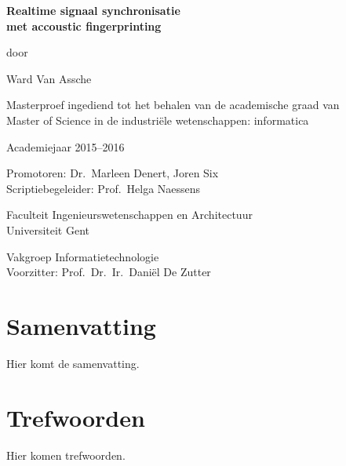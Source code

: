 
\newpage

{
\setlength{\baselineskip}{14pt}
\setlength{\parindent}{0pt}
\setlength{\parskip}{8pt}

\begin{center}

\noindent \textbf{\huge
Realtime signaal synchronisatie\\[8pt]
met accoustic fingerprinting
}

door 

Ward Van Assche

Masterproef ingediend tot het behalen van de academische graad van\\
Master of Science in de industri\"{e}le wetenschappen: informatica

Academiejaar 2015--2016

Promotoren: Dr.~Marleen Denert, Joren Six\\
Scriptiebegeleider: Prof.~Helga Naessens

Faculteit Ingenieurswetenschappen en Architectuur\\
Universiteit Gent

Vakgroep Informatietechnologie\\
Voorzitter: Prof.~Dr.~Ir.~Dani\"{e}l De Zutter


\end{center}

\section*{Samenvatting}


Hier komt de samenvatting.


\section*{Trefwoorden}


Hier komen trefwoorden.

}

\newpage %
